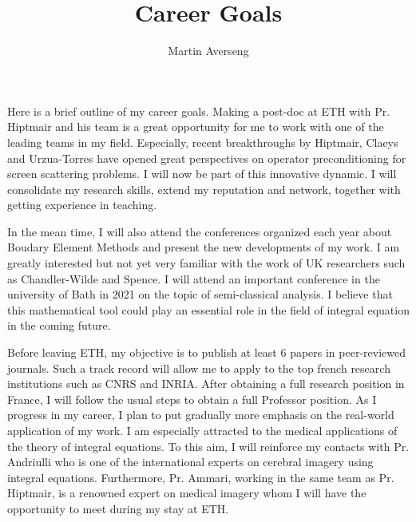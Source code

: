 \documentclass[]{article}
\title{Career Goals}
\author{Martin Averseng}
\begin{document}
\maketitle

Here is a brief outline of my career goals.
Making a post-doc at ETH with Pr. Hiptmair and his team is a great opportunity for me to work with one of the leading teams in my field. Especially, recent breakthroughs by Hiptmair, Claeys and Urzua-Torres have opened great perspectives on operator preconditioning for screen scattering problems. I will now be part of this innovative dynamic. I will consolidate my research skills, extend my reputation and network, together with getting experience in teaching. 

In the mean time, I will also attend the conferences organized each year about Boudary Element Methods and present the new developments of my work. I am greatly interested but not yet very familiar with the work of UK researchers such as Chandler-Wilde and Spence. I will attend an important conference in the university of Bath in 2021 on the topic of semi-classical analysis. I believe that this mathematical tool could play an essential role in the field of integral equation in the coming future. 

Before leaving ETH, my objective is to publish at least 6 papers in peer-reviewed journals. Such a track record will allow me to apply to the top french research institutions such as CNRS and INRIA. After obtaining a full research position in France, I will follow the usual steps to obtain a full Professor position. 
As I progress in my career, I plan to put gradually more emphasis on the real-world application of my work. I am especially attracted to the medical applications of the theory of integral equations. To this aim, I will reinforce my contacts with Pr. Andriulli who is one of the international experts on cerebral imagery using integral equations. Furthermore, Pr. Ammari, working in the same team as Pr. Hiptmair, is a renowned expert on medical imagery whom I will have the opportunity to meet during my stay at ETH. 
\end{document}
